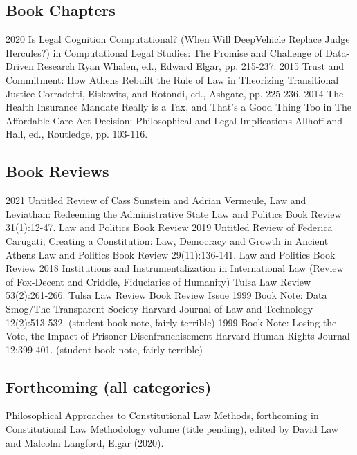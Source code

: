 \documentclass[letterpaper]{moderncv}
\begin{document}
\subsection{Book Chapters}
\cventry
{2020}
{Is Legal Cognition Computational? (When Will DeepVehicle Replace Judge Hercules?)}
{}
{in Computational Legal Studies: The Promise and Challenge of Data-Driven Research}
{}
{Ryan Whalen, ed., Edward Elgar, pp. 215-237.}
\vspace{1mm}
\cventry
{2015}
{Trust and Commitment: How Athens Rebuilt the Rule of Law}
{}
{in Theorizing Transitional Justice}
{}
{Corradetti, Eiskovits, and Rotondi, ed., Ashgate, pp. 225-236.}
\vspace{1mm}
\cventry
{2014}
{The Health Insurance Mandate Really is a Tax, and That's a Good Thing Too}
{}
{in The Affordable Care Act Decision: Philosophical and Legal Implications}
{}
{Allhoff and Hall, ed., Routledge, pp. 103-116.}
\vspace{1mm}
\vspace{1mm}

\subsection{Book Reviews}
\cventry
{2021}
{Untitled Review of Cass Sunstein and Adrian Vermeule, Law and Leviathan: Redeeming the Administrative State}
{}
{Law and Politics Book Review}
{}
{31(1):12-47. Law and Politics Book Review}
\vspace{1mm}
\cventry
{2019}
{Untitled Review of Federica Carugati, Creating a Constitution: Law, Democracy and Growth in Ancient Athens}
{}
{Law and Politics Book Review}
{}
{29(11):136-141. Law and Politics Book Review}
\vspace{1mm}
\cventry
{2018}
{Institutions and Instrumentalization in International Law (Review of Fox-Decent and Criddle, Fiduciaries of Humanity)}
{}
{Tulsa Law Review}
{}
{53(2):261-266. Tulsa Law Review Book Review Issue}
\vspace{1mm}
\cventry
{1999}
{Book Note: Data Smog/The Transparent Society}
{}
{Harvard Journal of Law and Technology}
{}
{12(2):513-532. (student book note, fairly terrible)}
\vspace{1mm}
\cventry
{1999}
{Book Note: Losing the Vote, the Impact of Prisoner Disenfranchisement}
{}
{Harvard Human Rights Journal}
{}
{12:399-401. (student book note, fairly terrible)}
\vspace{1mm}
\vspace{1mm}

\subsection{Forthcoming (all categories)}
\cvitem
{}
{Philosophical Approaches to Constitutional Law Methods, forthcoming in Constitutional Law Methodology volume (title pending), edited by David Law and Malcolm Langford, Elgar (2020).}
\vspace{1mm}
\end{document}
